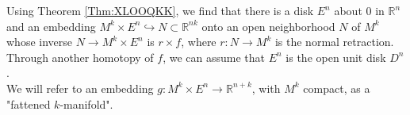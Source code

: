 \documentclass[reqno]{amsart}
\theoremstyle{definition}
\theoremstyle{remark}
\begin{document}
Using Theorem \ref{Thm:XLOOQKK}, we find that
there is a disk $E^{n}$ about $0$ in $\mathbb{R}^{n}$ and
an embedding $M^{k} \times E^{n} \hookrightarrow 
N \subset \mathbb{R}^{n k} $ onto an open neighborhood
$N$ of $M^{k}$ whose inverse $N \to 
M^{k} \times E^{n}$ is $r \times f$, where
$r \colon N \to  M^{k}$ is the normal retraction.\\
\linebreak
Through another homotopy of $f$, we can assume that
$E^{n}$ is the open unit disk
$D^{n}$.\\

We will refer to an embedding
$g \colon M^{k} \times E^{n} \to \mathbb{R}^{n+k}$, with
$M^{k}$ compact, as a
"fattened $k$-manifold".












\newpage
\printbibliography
\end{document}
